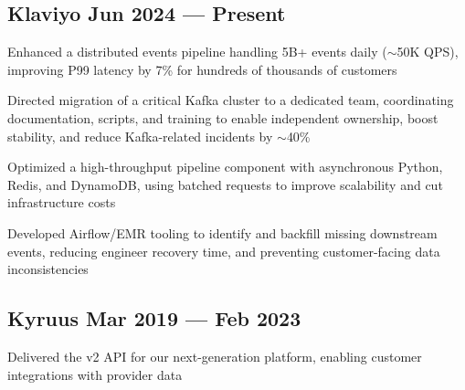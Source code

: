 
\subsection{{Klaviyo \hfill Jun 2024 --- Present}}
\begin{zitemize}
\item Enhanced a distributed events pipeline handling 5B+ events daily ($\sim$50K QPS), improving P99 latency by 7\% for hundreds of thousands of customers
\item Directed migration of a critical Kafka cluster to a dedicated team, coordinating documentation, scripts, and training to enable independent ownership, boost stability, and reduce Kafka-related incidents by $\sim$40\%
\item Optimized a high-throughput pipeline component with asynchronous Python, Redis, and DynamoDB, using batched requests to improve scalability and cut infrastructure costs
\item Developed Airflow/EMR tooling to identify and backfill missing downstream events, reducing engineer recovery time, and preventing customer-facing data inconsistencies
\end{zitemize}


\subsection{{Kyruus \hfill Mar 2019 --- Feb 2023}}
\begin{zitemize}
\item Delivered the v2 API for our next-generation platform, enabling customer integrations with provider data
\end{zitemize}

